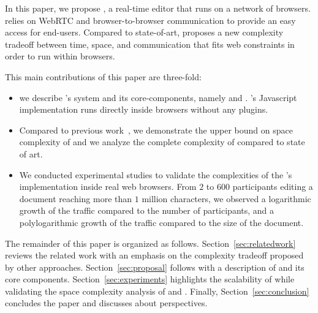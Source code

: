 In this paper, we propose \CRATE, a real-time editor that runs on a network of
browsers. \CRATE relies on WebRTC and browser-to-browser communication to
provide an easy access for end-users. Compared to state-of-art, \CRATE proposes
a new complexity tradeoff between time, space, and communication that fits web
constraints in order to run within browsers.

This main contributions of this paper are three-fold:
\begin{itemize}
\item we describe \CRATE's system and its core-components, namely \LSEQ and
  \SPRAY. \CRATE's Javascript implementation runs directly inside browsers
  without any plugins.
\item Compared to previous work~\cite{nedelec2013lseq}, we demonstrate the upper
  bound on space complexity of \LSEQ and we analyze the complete complexity of
  \CRATE compared to state of art.
\item We conducted experimental studies to validate the complexities of the
  \CRATE's implementation inside real web browsers. From $2$ to $600$
  participants editing a document reaching more than $1$ million characters, we
  observed a logarithmic growth of the traffic compared to the number of
  participants, and a polylogarithmic growth of the traffic compared to the size
  of the document.
\end{itemize}

The remainder of this paper is organized as
follows. Section~\ref{sec:relatedwork} reviews the related work with an emphasis
on the complexity tradeoff proposed by other
approaches. Section~\ref{sec:proposal} follows with a description of \CRATE and
its core components. Section~\ref{sec:experiments} highlights the scalability of
\CRATE while validating the space complexity analysis of \LSEQ and
\SPRAY. Finally, Section~\ref{sec:conclusion} concludes the paper and discusses
about perspectives.

